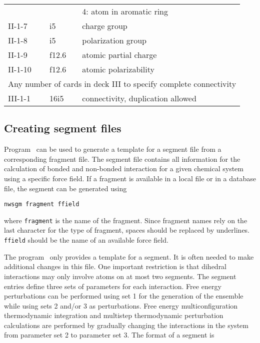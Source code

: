 \begin{center}
\begin{tabular}{lll}
        &        & 4: atom in aromatic ring\\
II-1-7  & i5     & charge group\\
II-1-8  & i5     & polarization group\\
II-1-9  & f12.6  & atomic partial charge\\
II-1-10 & f12.6  & atomic polarizability\\
\hline
\multicolumn{3}{l}{Any number of cards in deck III to specify complete 
connectivity} \\
\hline
III-1-1  & 16i5   & connectivity, duplication allowed\\ 
\hline\hline
\end{tabular}
\end{center}
\subsection{Creating segment files}
\label{nwsgm}
Program \nwsgm\ can be used to generate a template for a segment file 
from a corresponding fragment file. The segment file contains all
information for the calculation of bonded and non-bonded interaction
for a given chemical system using a specific force field. If a
fragment is available in a local file or in a database file, the
segment can be generated using
\begin{verbatim}
nwsgm fragment ffield
\end{verbatim}
where \verb+fragment+ is the name of the fragment. Since fragment
names rely on the last character for the type of fragment, spaces
should be replaced by underlines. \verb+ffield+ should be the
name of an available force field.
\par
The program \nwsgm\ only provides a template for a segment. It is
often needed to make additional changes in this file. One important 
restriction is that dihedral interactions may only involve atoms on 
at most two segments. The segment entries define three sets of
parameters for each interaction. Free energy perturbations can be
performed using set 1 for the generation of the ensemble while using
sets 2 and/or 3 as perturbations. Free energy multiconfiguration 
thermodynamic integration and multistep thermodynamic perturbation
calculations are performed by gradually changing the interactions in
the system from parameter set 2 to parameter set 3.
The format of a segment is
